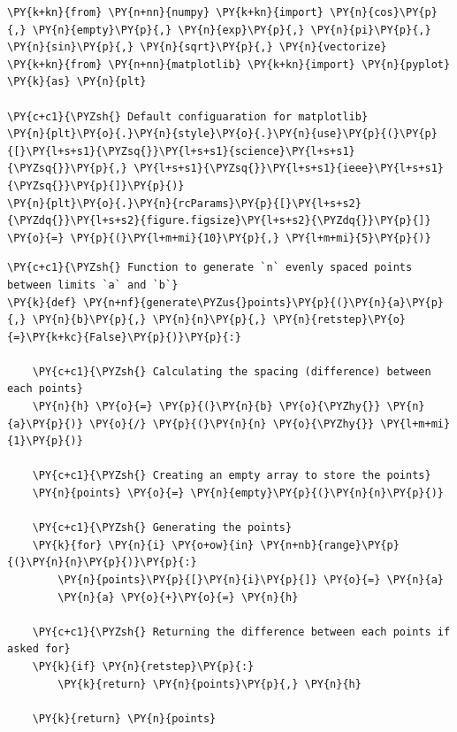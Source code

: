     \begin{tcolorbox}[breakable, size=fbox, boxrule=1pt, pad at break*=1mm,colback=cellbackground, colframe=cellborder]
\begin{Verbatim}[commandchars=\\\{\}]
\PY{k+kn}{from} \PY{n+nn}{numpy} \PY{k+kn}{import} \PY{n}{cos}\PY{p}{,} \PY{n}{empty}\PY{p}{,} \PY{n}{exp}\PY{p}{,} \PY{n}{pi}\PY{p}{,} \PY{n}{sin}\PY{p}{,} \PY{n}{sqrt}\PY{p}{,} \PY{n}{vectorize}
\PY{k+kn}{from} \PY{n+nn}{matplotlib} \PY{k+kn}{import} \PY{n}{pyplot} \PY{k}{as} \PY{n}{plt}

\PY{c+c1}{\PYZsh{} Default configuaration for matplotlib}
\PY{n}{plt}\PY{o}{.}\PY{n}{style}\PY{o}{.}\PY{n}{use}\PY{p}{(}\PY{p}{[}\PY{l+s+s1}{\PYZsq{}}\PY{l+s+s1}{science}\PY{l+s+s1}{\PYZsq{}}\PY{p}{,} \PY{l+s+s1}{\PYZsq{}}\PY{l+s+s1}{ieee}\PY{l+s+s1}{\PYZsq{}}\PY{p}{]}\PY{p}{)}
\PY{n}{plt}\PY{o}{.}\PY{n}{rcParams}\PY{p}{[}\PY{l+s+s2}{\PYZdq{}}\PY{l+s+s2}{figure.figsize}\PY{l+s+s2}{\PYZdq{}}\PY{p}{]} \PY{o}{=} \PY{p}{(}\PY{l+m+mi}{10}\PY{p}{,} \PY{l+m+mi}{5}\PY{p}{)}
\end{Verbatim}
\end{tcolorbox}

    \begin{tcolorbox}[breakable, size=fbox, boxrule=1pt, pad at break*=1mm,colback=cellbackground, colframe=cellborder]
\begin{Verbatim}[commandchars=\\\{\}]
\PY{c+c1}{\PYZsh{} Function to generate `n` evenly spaced points between limits `a` and `b`}
\PY{k}{def} \PY{n+nf}{generate\PYZus{}points}\PY{p}{(}\PY{n}{a}\PY{p}{,} \PY{n}{b}\PY{p}{,} \PY{n}{n}\PY{p}{,} \PY{n}{retstep}\PY{o}{=}\PY{k+kc}{False}\PY{p}{)}\PY{p}{:}

    \PY{c+c1}{\PYZsh{} Calculating the spacing (difference) between each points}
    \PY{n}{h} \PY{o}{=} \PY{p}{(}\PY{n}{b} \PY{o}{\PYZhy{}} \PY{n}{a}\PY{p}{)} \PY{o}{/} \PY{p}{(}\PY{n}{n} \PY{o}{\PYZhy{}} \PY{l+m+mi}{1}\PY{p}{)}

    \PY{c+c1}{\PYZsh{} Creating an empty array to store the points}
    \PY{n}{points} \PY{o}{=} \PY{n}{empty}\PY{p}{(}\PY{n}{n}\PY{p}{)}

    \PY{c+c1}{\PYZsh{} Generating the points}
    \PY{k}{for} \PY{n}{i} \PY{o+ow}{in} \PY{n+nb}{range}\PY{p}{(}\PY{n}{n}\PY{p}{)}\PY{p}{:}
        \PY{n}{points}\PY{p}{[}\PY{n}{i}\PY{p}{]} \PY{o}{=} \PY{n}{a}
        \PY{n}{a} \PY{o}{+}\PY{o}{=} \PY{n}{h}

    \PY{c+c1}{\PYZsh{} Returning the difference between each points if asked for}
    \PY{k}{if} \PY{n}{retstep}\PY{p}{:}
        \PY{k}{return} \PY{n}{points}\PY{p}{,} \PY{n}{h}

    \PY{k}{return} \PY{n}{points}
\end{Verbatim}
\end{tcolorbox}

